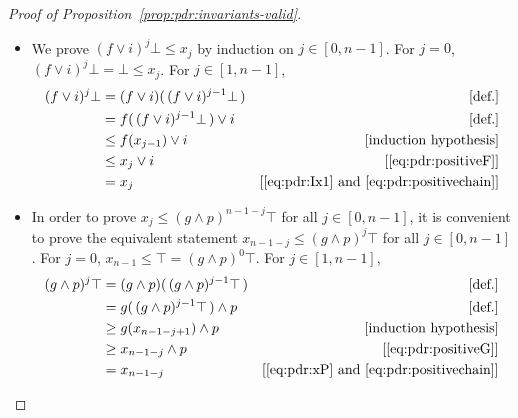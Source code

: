 \begin{proof}[Proof of Proposition~\ref{prop:pdr:invariants-valid}]
	\begin{itemize}
		\item We prove $(f \lor i)^j \bot \leq x_j$ by induction on $j \in [0, n-1]$.
		      For $j=0$, $(f \lor i)^j  \bot = \bot \leq x_j$. For $j \in [1,n-1]$,
		      \begin{align*}
			      (f \lor i)^j \bot
			       & = (f \lor i) (\, (f \lor i)^{j-1} \bot \,) & [\text{def.}]                                                \\
			       & = f (\, (f \lor i)^{j-1} \bot \,)  \lor i  & [\text{def.}]                                                \\
			       & \leq f(x_{j-1}) \lor i                     & [\text{induction hypothesis}]                                \\
			       & \leq x_j \lor i                            & [\eqref{eq:pdr:positiveF}]                                   \\
			       & = x_j                                      & [\eqref{eq:pdr:Ix1}\text{ and }\eqref{eq:pdr:positivechain}]
		      \end{align*}
		\item In order to prove $x_j \leq (g \land p)^{n-1-j} \top$ for all $j \in [0, n-1]$, it is convenient to prove the equivalent statement  $x_{n-1-j} \leq (g \land p)^{j} \top$ for all $j \in [0, n-1]$.
		      For $j=0$, $x_{n-1} \leq \top = (g \land p)^{0} \top$. For $j \in [1,n-1]$,
		      \begin{align*}
			      (g \land p)^{j} \top
			       & = (g \land p) (\, (g \land p)^{j-1} \top \,) & [\text{def.}]                                               \\
			       & = g (\, (g \land p)^{j-1} \top \,)  \land p  & [\text{def.}]                                               \\
			       & \geq g(x_{n-1-j+1}) \land p                  & [\text{induction hypothesis}]                               \\
			       & \geq x_{n-1-j} \land p                       & [\eqref{eq:pdr:positiveG}]                                  \\
			       & = x_{n-1-j}                                  & [\eqref{eq:pdr:xP}\text{ and }\eqref{eq:pdr:positivechain}]
		      \end{align*}
	\end{itemize}


\end{proof}
